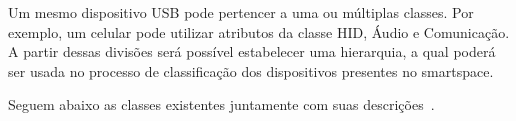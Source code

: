 Um mesmo dispositivo USB pode pertencer a uma ou múltiplas classes. Por exemplo, um celular pode utilizar atributos da classe HID, Áudio e Comunicação. A partir dessas divisões será possível estabelecer uma hierarquia, a qual poderá ser usada no processo de classificação dos dispositivos presentes no smartspace.

Seguem abaixo as classes existentes juntamente com suas descrições~\cite{usbclasscodes}.

\begin{comment}
\begin{table}
	\begin{center}
		\begin{tabular}{cccc}
		\hline
		\multicolumn{4}{c}{\textbf{Classes de Dispositivos}}													\\
		\hline
		Audio					&	Comunicação				&	Interface Humana (HID)	&	Físico 				\\
		\hline
		Imagem					&	Impressora				&	Disco Rígido			&	Hub 				\\
		\hline
		\emph{Smart Card}		&	Segurança de Conteúdo	&	Vídeo					&	Saúde Pessoal 		\\
		\hline
		Diagnóstico				&	Controlador Wireless	&	Diversos				&	Aplicação Específica\\
		\hline
		Fabricante Específico	&							&							&						\\
		\hline
		\end{tabular}
	\end{center}
	\caption{Exemplos de classes de dispositivos USB~\cite{usbclasscodes}.}
	\label{tab:dispositivos_usb}
\end{table}
\end{comment}

